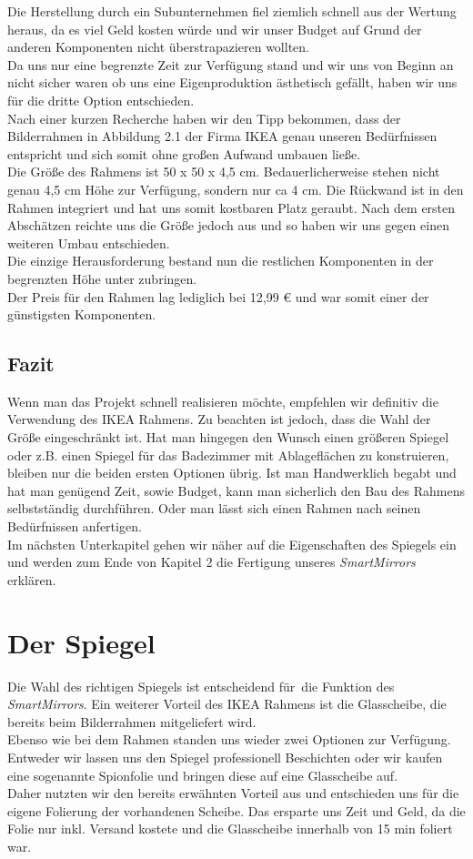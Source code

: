 Die Herstellung durch ein Subunternehmen fiel ziemlich schnell aus der Wertung heraus, da es viel Geld kosten würde und wir unser Budget auf Grund der anderen Komponenten nicht überstrapazieren wollten. \\
Da uns nur eine begrenzte Zeit zur Verfügung stand und wir uns von Beginn an nicht sicher waren ob uns eine Eigenproduktion ästhetisch gefällt, haben wir uns für die dritte Option entschieden. \\
Nach einer kurzen Recherche haben wir den Tipp bekommen, dass der Bilderrahmen in Abbildung 2.1 der Firma IKEA genau unseren Bedürfnissen entspricht und sich somit ohne großen Aufwand umbauen ließe. \\
Die Größe des Rahmens ist 50 x 50 x 4,5 cm. Bedauerlicherweise stehen nicht genau 4,5 cm Höhe zur Verfügung, sondern nur ca 4 cm. Die Rückwand ist in den Rahmen integriert und hat uns somit kostbaren Platz geraubt. Nach dem ersten Abschätzen reichte uns die Größe jedoch aus und so haben wir uns gegen einen weiteren Umbau entschieden. \\ 
Die einzige Herausforderung bestand nun die restlichen Komponenten in der begrenzten Höhe unter zubringen. \\
Der Preis für den Rahmen lag lediglich bei 12,99 € und war somit einer der günstigsten Komponenten.

\subsection{Fazit}
Wenn man das Projekt schnell realisieren möchte, empfehlen wir definitiv die Verwendung des IKEA Rahmens. Zu beachten ist jedoch, dass die Wahl der Größe eingeschränkt ist. Hat man hingegen den Wunsch einen größeren Spiegel oder z.B. einen Spiegel für das Badezimmer mit Ablageflächen zu konstruieren, bleiben nur die beiden ersten Optionen übrig. Ist man Handwerklich begabt und hat man genügend Zeit, sowie Budget, kann man sicherlich den Bau des Rahmens selbstständig durchführen. Oder man lässt sich einen Rahmen nach seinen Bedürfnissen anfertigen. \\
Im nächsten Unterkapitel gehen wir näher auf die Eigenschaften des Spiegels ein und werden zum Ende von Kapitel 2 die Fertigung unseres \textit{SmartMirrors} erklären. 


\section{Der Spiegel}
Die Wahl des richtigen Spiegels ist entscheidend für die Funktion des \textit{SmartMirrors}. Ein weiterer Vorteil des IKEA Rahmens ist die Glasscheibe, die bereits beim Bilderrahmen mitgeliefert wird. \\
Ebenso wie bei dem Rahmen standen uns wieder zwei Optionen zur Verfügung. Entweder wir lassen uns den Spiegel professionell Beschichten oder wir kaufen eine sogenannte Spionfolie und bringen diese auf eine Glasscheibe auf. \\
Daher nutzten wir den bereits erwähnten Vorteil aus und entschieden uns für die eigene Folierung der vorhandenen Scheibe. Das ersparte uns Zeit und Geld, da die Folie nur  inkl. Versand kostete und die Glasscheibe innerhalb von 15 min foliert war.

